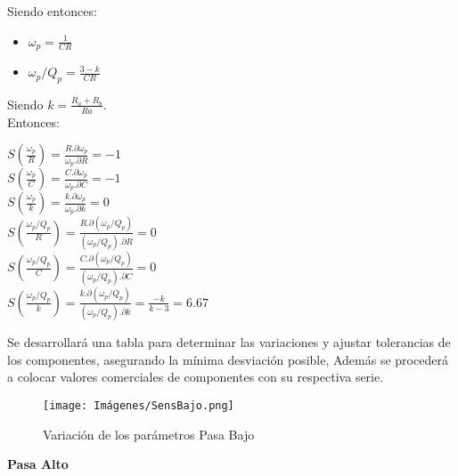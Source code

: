     Siendo entonces:\\

    \begin{itemize}
        \item $\omega_p = \frac{1}{CR}$
        \item $\omega_p/Q_p = \frac{3-k}{CR}$
    \end{itemize}

    Siendo $k = \frac{R_a + R_b}{Ra}$.\\

    Entonces:\\

    \begin{center}
        $S(\frac{\omega_p}{R}) = \frac{R.\partial\omega_p}{\omega_p.\partial R} = -1$\\
        
        $S(\frac{\omega_p}{C}) = \frac{C.\partial\omega_p}{\omega_p.\partial C} = -1$\\
        
        $S(\frac{\omega_p}{k}) = \frac{k.\partial\omega_p}{\omega_p.\partial k} = 0$\\
        
        $S(\frac{\omega_p/Q_p}{R}) = \frac{R.\partial(\omega_p/Q_p)}{(\omega_p/Q_p).\partial R} = 0$\\
        
        $S(\frac{\omega_p/Q_p}{C}) = \frac{C.\partial(\omega_p/Q_p)}{(\omega_p/Q_p).\partial C} = 0$\\

        $S(\frac{\omega_p/Q_p}{k}) = \frac{k.\partial(\omega_p/Q_p)}{(\omega_p/Q_p).\partial k} = \frac{-k}{k-3} = 6.67$\\
    \end{center}    

    Se desarrollará una tabla para determinar las variaciones y ajustar tolerancias de los componentes, asegurando la mínima desviación posible, Además se procederá a colocar valores comerciales de componentes con su respectiva serie.\\

    \begin{figure}[ht]
        \centering
        \texttt{[image: Imágenes/SensBajo.png]}
        \caption{Variación de los parámetros Pasa Bajo}
    \end{figure}

    \newpage
    \Large{\textbf{Pasa Alto}}
    
    \begin{center}
    \end{center}
    
